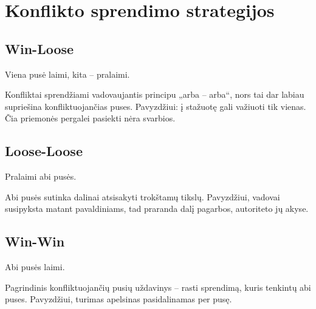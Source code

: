 \section{Konflikto sprendimo strategijos}

\subsection{Win-Loose}

Viena pusė laimi, kita – pralaimi.

Konfliktai sprendžiami vadovaujantis principu „arba – arba“, nors tai
dar labiau supriešina konfliktuojančias puses. Pavyzdžiui: į stažuotę
gali važiuoti tik vienas. Čia priemonės pergalei pasiekti nėra
svarbios.

\subsection{Loose-Loose}

Pralaimi abi pusės.

Abi pusės sutinka dalinai atsisakyti trokštamų tikslų. Pavyzdžiui, vadovai
susipyksta matant pavaldiniams, tad praranda dalį pagarbos, autoriteto
jų akyse.

\subsection{Win-Win}

Abi pusės laimi.

Pagrindinis konfliktuojančių pusių uždavinys – rasti sprendimą, kuris
tenkintų abi puses. Pavyzdžiui, turimas apelsinas pasidalinamas
per pusę.

